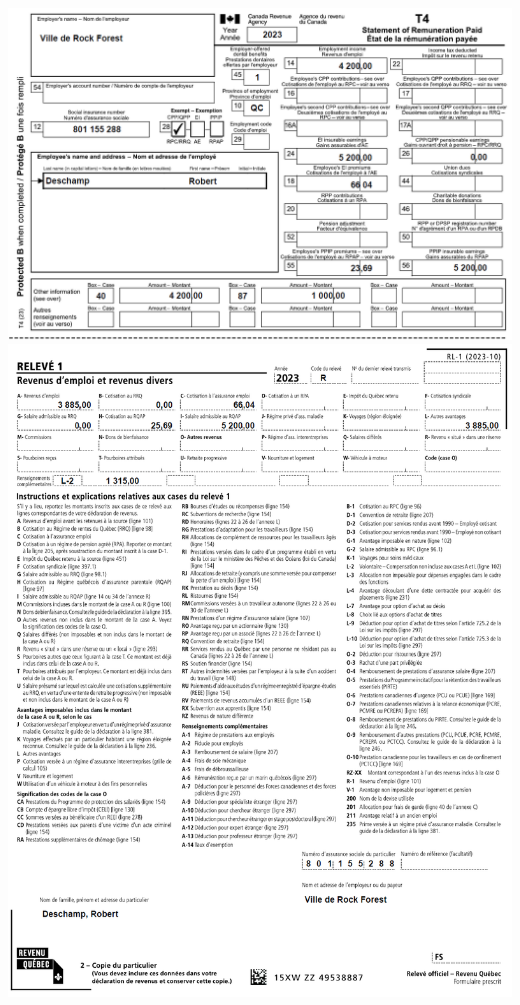 \begin{question}
	
	
	\noindent\includegraphics[width=\textwidth]{exercice/3-4/Q8/T4.png}
	\includegraphics[width=\textwidth]{exercice/3-4/Q8/RL1.png}
\end{question}




